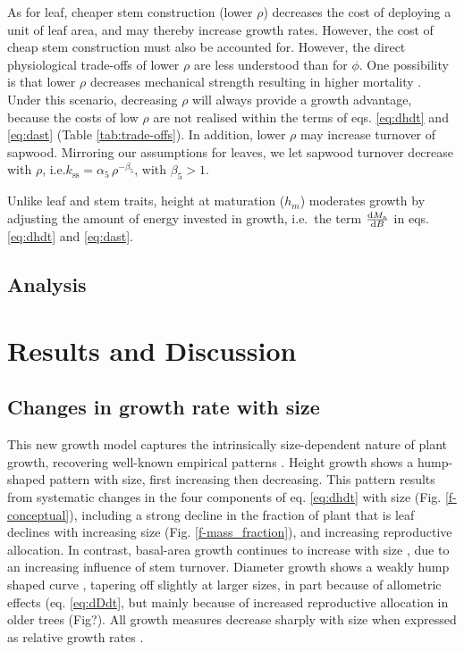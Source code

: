 \documentclass[12pt, a4paper]{article}
\begin{document}
As for leaf, cheaper stem construction (lower $\rho$) decreases the
cost of deploying a unit of leaf area, and may thereby increase growth
rates. However, the cost of cheap stem construction must also be
accounted for. However, the direct physiological trade-offs of lower
$\rho$ are less understood than for $\phi$. One possibility is that
lower $\rho$ decreases mechanical strength resulting in higher
mortality \citep{chave-2009, wright-2010}. Under
this scenario, decreasing $\rho$ will always provide a growth
advantage, because the costs of low $\rho$ are not realised within the
terms of eqs. \ref{eq:dhdt} and \ref{eq:dast} (Table
\ref{tab:trade-offs}). In addition, lower $\rho$ may increase turnover
of sapwood. Mirroring our assumptions for leaves, we let sapwood
turnover decrease with $\rho$,
i.e.$k_\textrm{ss}=\alpha_5 \, \rho^{-\beta_5}$, with $\beta_5 > 1$.

Unlike leaf and stem traits, height at maturation ($h_m$) moderates
growth by adjusting the amount of energy invested in growth, i.e.~the
term $\frac{{\rm d}M_{\rm a}}{{\rm d}B}$ in eqs.
\ref{eq:dhdt} and \ref{eq:dast}.

\subsection{Analysis}\label{analysis}



\newpage
\section{Results and Discussion}\label{results}

\subsection{Changes in growth rate with size}

This new growth model captures the intrinsically size-dependent nature
of plant growth, recovering well-known
empirical patterns \citep{sillett-2010, king-2011}. Height growth shows a hump-shaped pattern
with size, first increasing then decreasing. This pattern results from
systematic changes in the four components of eq. \ref{eq:dhdt} with size
(Fig. \ref{f-conceptual}), including a strong decline in the fraction of plant
that is leaf declines with increasing size (Fig. \ref{f-mass_fraction}),
and increasing reproductive allocation. In contrast, basal-area growth
continues to increase with size \citep{sillett-2010, stephenson-2014},
due to an increasing influence of stem
turnover. Diameter growth shows a weakly hump shaped
curve \citep{herault-2011}, tapering off slightly at larger
sizes, in part because of allometric effects (eq. \ref{eq:dDdt}, but
mainly because of increased reproductive allocation in older trees
(Fig?). All growth measures decrease sharply with size when expressed as
relative growth rates \citep{iida-2014}.
\end{document}
